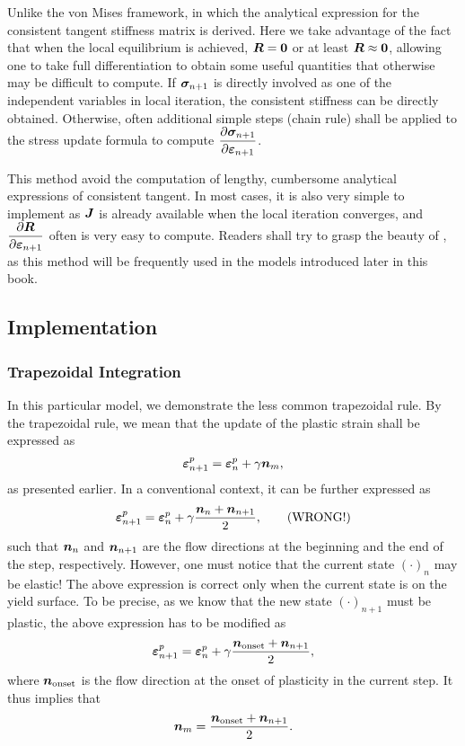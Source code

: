 Unlike the von Mises framework, in which the analytical expression for the consistent tangent stiffness matrix is derived. Here we take advantage of the fact that when the local equilibrium is achieved, $\bm{R}=\bm{0}$ or at least $\bm{R}\approx\bm{0}$, allowing one to take full differentiation to obtain some useful quantities that otherwise may be difficult to compute. If $\bm{\sigma}_{n+1}$ is directly involved as one of the independent variables in local iteration, the consistent stiffness can be directly obtained. Otherwise, often additional simple steps (chain rule) shall be applied to the stress update formula to compute $\dfrac{\partial{\bm{\sigma}_{n+1}}}{\partial{\bm{\varepsilon}_{n+1}}}$.

This method avoid the computation of lengthy, cumbersome analytical expressions of consistent tangent. In most cases, it is also very simple to implement as $\bm{J}$ is already available when the local iteration converges, and $\dfrac{\partial{\bm{R}}}{\partial{\bm{\varepsilon}_{n+1}}}$ often is very easy to compute. Readers shall try to grasp the beauty of , as this method will be frequently used in the models introduced later in this book.
\subsection{Implementation}
\subsubsection{Trapezoidal Integration}
In this particular model, we demonstrate the less common trapezoidal rule.
By the trapezoidal rule, we mean that the update of the plastic strain shall be expressed as
\begin{gather}
    \bm{\varepsilon}^p_{n+1}=\bm{\varepsilon}^p_{n}+\gamma\bm{n}_{m},
\end{gather}
as presented earlier.
In a conventional context, it can be further expressed as
\begin{gather}
    \bm{\varepsilon}^p_{n+1}=\bm{\varepsilon}^p_{n}+\gamma\dfrac{\bm{n}_{n}+\bm{n}_{n+1}}{2},\qquad\text{(WRONG!)}
\end{gather}
such that $\bm{n}_{n}$ and $\bm{n}_{n+1}$ are the flow directions at the beginning and the end of the step, respectively.
However, one must notice that the current state $\left(\cdot\right)_n$ may be elastic!
The above expression is correct only when the current state is on the yield surface.
To be precise, as we know that the new state $\left(\cdot\right)_{n+1}$ must be plastic, the above expression has to be modified as
\begin{gather}
    \bm{\varepsilon}^p_{n+1}=\bm{\varepsilon}^p_{n}+\gamma\dfrac{\bm{n}_\text{onset}+\bm{n}_{n+1}}{2},
\end{gather}
where $\bm{n}_\text{onset}$ is the flow direction at the onset of plasticity in the current step.
It thus implies that
\begin{gather}
    \bm{n}_{m}=\dfrac{\bm{n}_\text{onset}+\bm{n}_{n+1}}{2}.
\end{gather}

